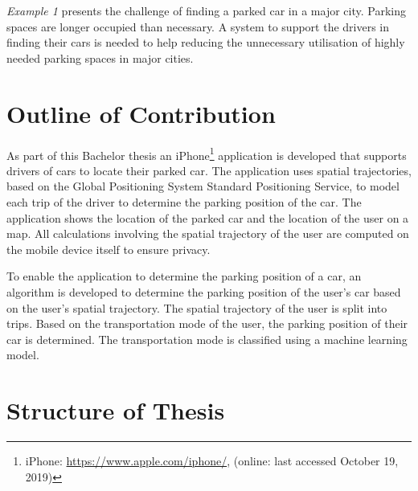 \textit{Example 1} presents the challenge of finding a parked car in a major city. Parking spaces are longer occupied than necessary. A system to support the drivers in finding their cars is needed to help reducing the unnecessary utilisation of highly needed parking spaces in major cities.

\section{Outline of Contribution}
As part of this Bachelor thesis an iPhone\footnote{iPhone: \url{https://www.apple.com/iphone/}, (online: last accessed October 19, 2019)} application is developed that supports drivers of cars to locate their parked car. The application uses spatial trajectories, based on the Global Positioning System Standard Positioning Service, to model each trip of the driver to determine the parking position of the car. The application shows the location of the parked car and the location of the user on a map. All calculations involving the spatial trajectory of the user are computed on the mobile device itself to ensure privacy.

To enable the application to determine the parking position of a car, an algorithm is developed to determine the parking position of the user's car based on the user's spatial trajectory. The spatial trajectory of the user is split into trips. Based on the transportation mode of the user, the parking position of their car is determined. The transportation mode is classified using a machine learning model. 

\section{Structure of Thesis}

